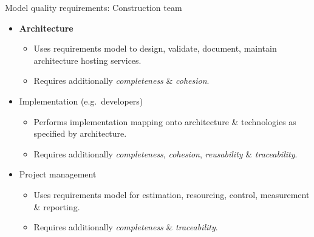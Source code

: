 \documentclass[a4]{article}
\begin{document}

\begin{frame}{Model quality requirements: Construction team}                      
  \begin{itemize} 
    \item<+-| alert@+> {\bf Architecture} 
      \begin{itemize}
        \item Uses requirements model to design, validate, document, maintain architecture hosting services.
        \item Requires additionally {\em completeness} \& {\em cohesion}.
      \end{itemize}
    \item<+-| alert@+> Implementation (e.g.\ developers)
      \begin{itemize}
	\item Performs implementation mapping onto architecture \& technologies as specified by architecture.
	\item Requires additionally {\em completeness}, {\em cohesion}, {\em reusability} \& {\em traceability}.
      \end{itemize}
    \item<+-| alert@+> Project management
      \begin{itemize}
	\item Uses requirements model for estimation, resourcing, control, measurement \& reporting.
	\item Requires additionally {\em completeness} \& {\em traceability}.
      \end{itemize}
  \end{itemize}
\end{frame}

\end{document}
